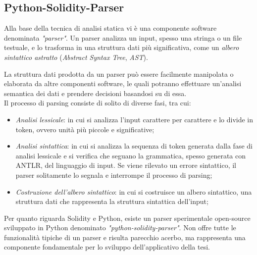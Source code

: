 {\subsection{Python-Solidity-Parser}
Alla base della tecnica di analisi statica vi è una componente software denominata \textit{"parser"}. Un parser analizza un input, spesso una stringa o un file testuale, e lo trasforma in una struttura dati più significativa, come un\textit{ albero sintattico astratto} (\textit{Abstract Syntax Tree}, \textit{AST}).\par
La struttura dati prodotta da un parser può essere facilmente manipolata o elaborata da altre componenti software, le quali potranno effettuare un'analisi semantica dei dati e prendere decisioni basandosi su di essa.\\ \newline
Il processo di parsing consiste di solito di diverse fasi, tra cui:
\begin{itemize}
	\item \textit{Analisi lessicale}: in cui si analizza l'input carattere per carattere e lo divide in token, ovvero unità più piccole e significative;
	\item \textit{Analisi sintattica}: in cui si analizza la sequenza di token generata dalla fase di analisi lessicale e si verifica che seguano la grammatica, spesso generata con ANTLR\cite{ANTLR}, del linguaggio di input. Se viene rilevato un errore sintattico, il parser solitamente lo segnala e interrompe il processo di parsing;
	\item \textit{Costruzione dell'albero sintattico}: in cui si costruisce un albero sintattico, una struttura dati che rappresenta la struttura sintattica dell'input;
\end{itemize}
Per quanto riguarda Solidity e Python, esiste un parser sperimentale open-source sviluppato in Python denominato \textit{"python-solidity-parser"}\cite{python-solidity-parser}. Non offre tutte le funzionalità tipiche di un parser e risulta parecchio acerbo, ma rappresenta una componente fondamentale per lo sviluppo dell'applicativo della tesi.
}
